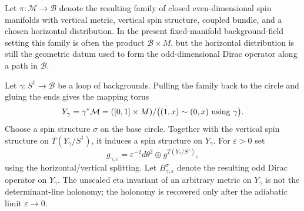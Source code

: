 Let \(\pi:\mathcal M\to\mathcal B\) denote the resulting family of closed
even-dimensional spin manifolds with vertical metric, vertical spin
structure, coupled bundle, and a chosen horizontal distribution.  In the
present fixed-manifold background-field setting this family is often the
product \(\mathcal B\times M\), but the horizontal distribution is still the
geometric datum used to form the odd-dimensional Dirac operator along a path
in \(\mathcal B\).

Let \(\gamma:S^1\to\mathcal B\) be a loop of backgrounds.  Pulling the family
back to the circle and gluing the ends gives the mapping torus
\begin{equation}
  Y_\gamma
  =
  \gamma^*\mathcal M
  =
  ([0,1]\times M)/\bigl((1,x)\sim(0,x)\hbox{ using }\gamma\bigr).
  \label{eq:mapping-torus-background-loop}
\end{equation}
Choose a spin structure \(\sigma\) on the base circle.  Together with the
vertical spin structure on \(T(Y_\gamma/S^1)\), it induces a spin structure
on \(Y_\gamma\).  For \(\varepsilon>0\) set
\begin{equation}
  g_{\gamma,\varepsilon}
  =
  \varepsilon^{-2}d\theta^2
  \oplus
  g^{T(Y_\gamma/S^1)},
  \label{eq:bismut-freed-adiabatic-metric}
\end{equation}
using the horizontal/vertical splitting.  Let
\(B_{\gamma,\varepsilon}^{\sigma}\) denote the resulting odd Dirac operator
on \(Y_\gamma\).  The unscaled eta invariant of an arbitrary metric on
\(Y_\gamma\) is not the determinant-line holonomy; the holonomy is recovered
only after the adiabatic limit \(\varepsilon\to0\).

